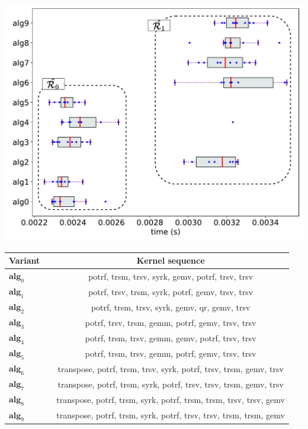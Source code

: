 \documentclass[acmsmall,screen, review]{acmart}
\begin{document}
\begin{table}[!t]
		\begin{minipage}{1\textwidth}
		\centering
		\includegraphics[width=0.6\linewidth]{fig/ch3/gls-eg}
		\label{fig3:gls-eg}
	\end{minipage}
\hfill
\bigskip

	\begin{minipage}{1\textwidth}
		\centering
		\begin{adjustbox}{width=0.65\columnwidth,center}
			\begin{tabular}{@{}l cc@{}}
				\toprule
				\textbf{Variant} &&\textbf{Kernel sequence}\\
				\midrule
				$\mathbf{alg}_0$&& potrf, trsm, trsv, syrk, gemv, potrf, trsv, trsv \\
				$\mathbf{alg}_1$&& potrf, trsv, trsm, syrk, potrf, gemv, trsv, trsv\\
				$\mathbf{alg}_{2}$&& potrf, trsm, trsv, syrk, gemv, qr, gemv, trsv\\
				$\mathbf{alg}_{3}$&& potrf, trsv, trsm, gemm, potrf, gemv, trsv, trsv \\
				$\mathbf{alg}_{4}$&& potrf, trsm, trsv, gemm, gemv, potrf, trsv, trsv \\
				$\mathbf{alg}_{5}$&&  potrf, trsm, trsv, gemm, potrf, gemv, trsv, trsv \\
				$\mathbf{alg}_{6}$&& transpose, potrf, trsm, trsv, syrk, potrf, trsv, trsm, gemv, trsv\\
				$\mathbf{alg}_{7}$&& transpose, potrf, trsm, syrk, potrf, trsv, trsv, trsm, gemv, trsv \\
				$\mathbf{alg}_{8}$&& transpose, potrf, trsm, syrk, potrf, trsm, trsm, trsv, trsv, gemv \\
				$\mathbf{alg}_{9}$&&  transpose, potrf, trsm, syrk, potrf, trsv, trsv, trsm, trsm, gemv \\
				\bottomrule
			\end{tabular}
		\end{adjustbox}
		\label{tab3:gls-seq}
	\end{minipage}
	
\end{table}
\end{document}
